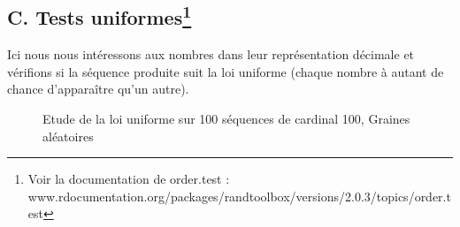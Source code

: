 \documentclass[
]{article}
\begin{document}
\subsection*{C. Tests uniformes\footnote{Voir la documentation de order.test : www.rdocumentation.org/packages/randtoolbox/versions/2.0.3/topics/order.test}}

Ici nous nous intéressons aux nombres dans leur représentation décimale
et vérifions si la séquence produite suit la loi uniforme (chaque nombre
à autant de chance d'apparaître qu'un autre).

\begin{figure}
\newline{}\caption{Etude de la loi uniforme sur 100 séquences de cardinal 100, Graines aléatoires}\label{fig:unnamed-chunk-9}
\end{figure}
\end{document}
